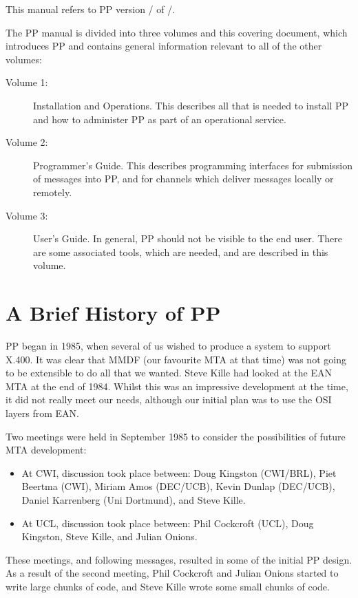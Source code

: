 This manual refers to PP version \ppversion/ of \ppdate/.

The PP manual is divided into three volumes and this covering document,
which introduces PP and contains general
information relevant to all of the other volumes:

\begin {description}
\item[Volume 1:] Installation and Operations.  This describes all that is
needed to install PP and how to administer PP as part of an operational
service.
\item[Volume 2:] Programmer's Guide.  This describes programming interfaces
for submission of messages into PP, and for channels which deliver messages
locally or remotely.
\item[Volume 3:] User's Guide.  In general, PP should not be visible to the
end user.  There are some associated tools, which are needed, and are
described in this volume.
\end {description}

\section {A Brief History of PP}

PP began in 1985, when several of us wished to produce a system to support
X.400.  It was clear that MMDF (our favourite MTA at that time) was not going to be
extensible to do all that we wanted.  Steve Kille had looked at the EAN MTA at the
end of 1984.  Whilst this was an impressive development at the time, it did
not really meet our needs, although our initial plan was to use the OSI
layers from EAN.   

Two meetings were held in September 1985 to consider the possibilities of
future MTA development:

\begin {itemize}
\item At CWI, discussion took place between: Doug Kingston (CWI/BRL),
Piet Beertma (CWI), Miriam Amos (DEC/UCB), Kevin Dunlap (DEC/UCB),
Daniel Karrenberg (Uni Dortmund), and Steve Kille.

\item At UCL, discussion took place between: Phil Cockcroft (UCL), Doug
Kingston, Steve Kille, and Julian Onions.   
\end {itemize}

These meetings, and following messages, resulted in some of the
initial PP design.  As a result of the second meeting, Phil Cockcroft
and Julian Onions started to write large chunks of code, and Steve
Kille wrote some small chunks of code.


